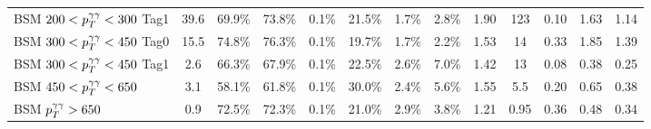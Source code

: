 \begin{tabular}{l|cccccccc|c|ccc}
     BSM $200<p_T^{\gamma\gamma}<300$ Tag1 & 39.6 & 69.9\% & 73.8\% & 0.1\% & 21.5\% & 1.7\% & 2.8\% & 1.90 & 123 & 0.10 & 1.63 & 1.14 \\
     [\cmsTabSkip]
     BSM $300<p_T^{\gamma\gamma}<450$ Tag0 & 15.5 & 74.8\% & 76.3\% & 0.1\% & 19.7\% & 1.7\% & 2.2\% & 1.53 & 14 & 0.33 & 1.85 & 1.39 \\
     BSM $300<p_T^{\gamma\gamma}<450$ Tag1 & 2.6 & 66.3\% & 67.9\% & 0.1\% & 22.5\% & 2.6\% & 7.0\% & 1.42 & 13 & 0.08 & 0.38 & 0.25 \\
     [\cmsTabSkip]
     BSM $450<p_T^{\gamma\gamma}<650$ & 3.1 & 58.1\% & 61.8\% & 0.1\% & 30.0\% & 2.4\% & 5.6\% & 1.55 & 5.5 & 0.20 & 0.65 & 0.38 \\
     [\cmsTabSkip]
     BSM $p_T^{\gamma\gamma}>650$ & 0.9 & 72.5\% & 72.3\% & 0.1\% & 21.0\% & 2.9\% & 3.8\% & 1.21 & 0.95 & 0.36 & 0.48 & 0.34 \\
     [\cmsTabSkip]
\end{tabular}

